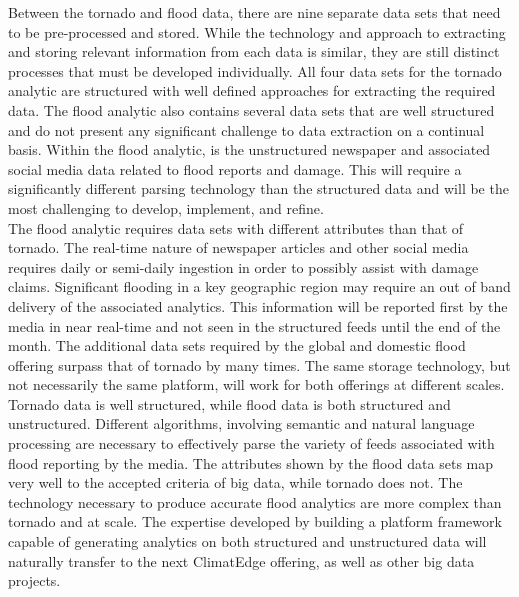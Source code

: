 Between the tornado and flood data, there are nine separate data sets that need to be pre-processed and stored. While the technology and approach to extracting and storing relevant information from each data is similar, they are still distinct processes that must be developed individually. All four data sets for the tornado analytic are structured with well defined approaches for extracting the required data. The flood analytic also contains several data sets that are well structured and do not present any significant challenge to data extraction on a continual basis. Within the flood analytic, is the unstructured newspaper and associated social media data related to flood reports and damage. This will require a significantly different parsing technology than the structured data and will be the most challenging to develop, implement, and refine.\\

The flood analytic requires data sets with different attributes than that of tornado. The real-time nature of newspaper articles and other social media requires daily or semi-daily ingestion in order to possibly assist with damage claims. Significant flooding in a key geographic region may require an out of band delivery of the associated analytics. This information will be reported first by the media in near real-time and not seen in the structured feeds until the end of the month. The additional data sets required by the global and domestic flood offering surpass that of tornado by many times. The same storage technology, but not necessarily the same platform, will work for both offerings at different scales. Tornado data is well structured, while flood data is both structured and unstructured. Different algorithms, involving semantic and natural language processing are necessary to effectively parse the variety of feeds associated with flood reporting by the media.  The attributes shown by the flood data sets map very well to the accepted criteria of big data, while tornado does not. The technology necessary to produce accurate flood analytics are more complex than tornado and at scale.  The expertise developed by building a platform framework capable of generating analytics on both structured and unstructured data will naturally transfer to the next ClimatEdge offering, as well as other big data projects.